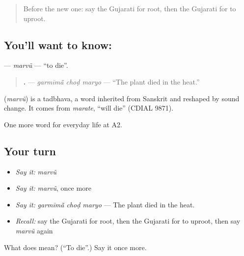 \label{lesson:GU-C241-marvu}



\begin{quote}
Before the new one: say the Gujarati for root, then the Gujarati for to uproot.
\end{quote}

\subsection*{You'll want to know: }
\textbf{} — \emph{marvũ} — \textquotedblleft{}to die\textquotedblright{}.

\begin{quote}
\textbf{  .} — \emph{garmīmā̃ choḍ maryo} — \textquotedblleft{}The plant died in the heat.\textquotedblright{}
\end{quote}

\begin{cousinweb}
\textbf{} (\emph{marvũ}) is a tadbhava, a word inherited from Sanskrit and reshaped by sound change. It comes from \emph{marate}, \textquotedblleft{}will die\textquotedblright{} (CDIAL 9871).
\end{cousinweb}

\begin{grammarlens}[title={What you've built}]
One more word for everyday life at A2.
\end{grammarlens}

\subsection*{Your turn}
\begin{itemize}
\raggedright
  \item \emph{Say it:} \emph{marvũ}
  \item \emph{Say it:} \emph{marvũ}, once more
  \item \emph{Say it:} \emph{garmīmā̃ choḍ maryo} — The plant died in the heat.
  \item \emph{Recall:} say the Gujarati for root, then the Gujarati for to uproot, then say \emph{marvũ} again
\end{itemize}

\begin{tcolorbox}[breakable,colback=teal!4,colframe=teal!35!black,title={Before you move on}]
What does  mean? (\textquotedblleft{}To die\textquotedblright{}.) Say it once more.
\end{tcolorbox}

